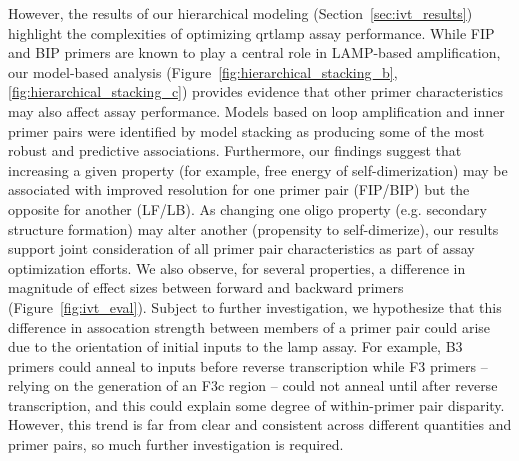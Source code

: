 \documentclass[../thesis.tex]{subfiles}
\begin{document}
However, the results of our hierarchical modeling (Section~\ref{sec:ivt_results}) highlight the complexities of optimizing \gls{qrtlamp} assay performance. While FIP and BIP primers are known to play a central role in LAMP-based amplification, our model-based analysis (Figure~\ref{fig:hierarchical_stacking_b}, \ref{fig:hierarchical_stacking_c}) provides evidence that other primer characteristics may also affect assay performance. Models based on loop amplification and inner primer pairs were identified by model stacking as producing some of the most robust and predictive associations. Furthermore, our findings suggest that increasing a given property (for example, free energy of self-dimerization) may be associated with improved resolution for one primer pair (FIP/BIP) but the opposite for another (LF/LB). As changing one oligo property (e.g. secondary structure formation) may alter another (propensity to self-dimerize), our results support joint consideration of all primer pair characteristics as part of assay optimization efforts. %
We also observe, for several properties, a difference in 
magnitude %
of effect sizes between forward and backward primers (Figure~\ref{fig:ivt_eval}). Subject to further investigation, we hypothesize that this difference in 
assocation strength %
between members of a primer pair could arise due to the orientation of initial  inputs to the \gls{lamp} assay. For example, B3 primers could anneal to  inputs before reverse transcription while F3 primers -- relying on the generation of an F3c region -- could not anneal until after reverse transcription, and this could explain some degree of within-primer pair disparity. However, this trend is far from clear and consistent across different quantities and primer pairs, so much further investigation is required.
\end{document}
